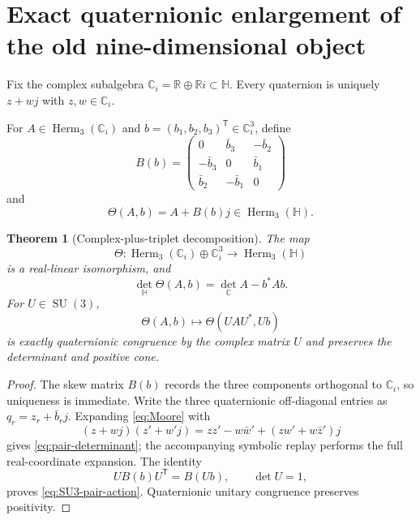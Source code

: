 \documentclass[11pt]{article}
\newtheorem{theorem}{Theorem}[section]
\theoremstyle{definition}
\theoremstyle{remark}
\newcommand{\R}{\mathbb R}
\newcommand{\C}{\mathbb C}
\newcommand{\Hh}{\mathbb H}
\newcommand{\Herm}{\operatorname{Herm}}
\newcommand{\SU}{\operatorname{SU}}
\begin{document}
\section{Exact quaternionic enlargement of the old nine-dimensional object}

Fix the complex subalgebra $\C_i=\R\oplus\R i\subset\Hh$.  Every quaternion is uniquely $z+w j$ with $z,w\in\C_i$.

For $A\in\Herm_3(\C_i)$ and $b=(b_1,b_2,b_3)^{\mathsf T}\in\C_i^3$, define
\begin{equation}\label{eq:Bb}
 B(b)=
 \begin{pmatrix}
 0&\bar b_3&-\bar b_2\\
 -\bar b_3&0&\bar b_1\\
 \bar b_2&-\bar b_1&0
 \end{pmatrix}
\end{equation}
and
\begin{equation}\label{eq:ThetaAb}
 \Theta(A,b)=A+B(b)j\in\Herm_3(\Hh).
\end{equation}

\begin{theorem}[Complex-plus-triplet decomposition]\label{thm:complex-triplet}
The map
\[
 \Theta:\Herm_3(\C_i)\oplus\C_i^3\longrightarrow\Herm_3(\Hh)
\]
is a real-linear isomorphism, and
\begin{equation}\label{eq:pair-determinant}
 \boxed{
 \det_{\Hh}\Theta(A,b)=\det_{\C}A-b^*Ab.}
\end{equation}
For $U\in\SU(3)$,
\begin{equation}\label{eq:SU3-pair-action}
 \Theta(A,b)\longmapsto\Theta(UAU^*,Ub)
\end{equation}
is exactly quaternionic congruence by the complex matrix $U$ and preserves the determinant and positive cone.
\end{theorem}

\begin{proof}
The skew matrix $B(b)$ records the three components orthogonal to $\C_i$, so uniqueness is immediate.  Write the three quaternionic off-diagonal entries as
$q_r=z_r+\bar b_rj$.  Expanding \eqref{eq:Moore} with
\[
 (z+w j)(z'+w'j)=zz'-w\bar w'+(zw'+w\bar z')j
\]
gives \eqref{eq:pair-determinant}; the accompanying symbolic replay performs the full real-coordinate expansion.  The identity
\[
 U B(b)U^{\mathsf T}=B(Ub),\qquad\det U=1,
\]
proves \eqref{eq:SU3-pair-action}.  Quaternionic unitary congruence preserves positivity.
\end{proof}
\end{document}
